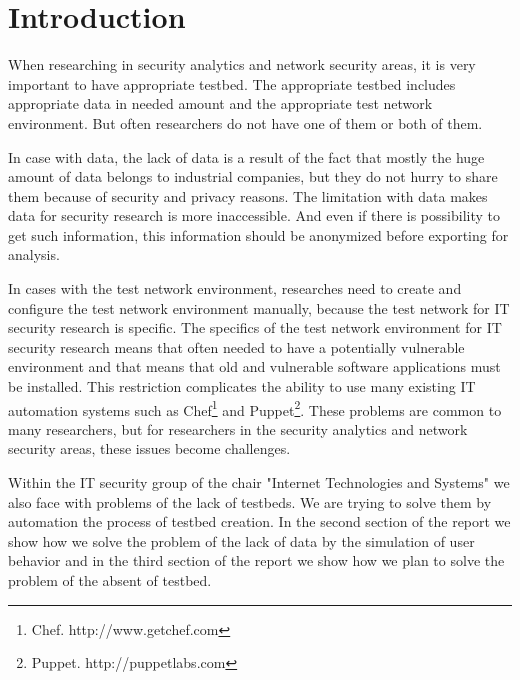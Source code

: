 \section{Introduction}


When researching in security analytics and network security areas, it is very important to have appropriate testbed. The appropriate testbed includes appropriate data in needed amount and the appropriate test network environment. But often researchers do not have one of them or both of them.  

In case with data, the lack of data is a result of the fact that mostly the huge amount of data belongs to industrial companies, but they do not hurry to share them because of security and privacy reasons. The limitation with data makes data for security research is more inaccessible. And even if there is possibility to get such information, this information should be anonymized before exporting for analysis.

In cases with the test network environment, researches need to create and configure the test network environment manually, because the test network for IT security research is specific. The specifics of the test network environment for IT security research means that often needed to have a potentially vulnerable environment and that means that old and vulnerable software applications must be installed. This restriction complicates the ability to use many existing IT automation systems such as Chef\footnote{Chef. http://www.getchef.com} and Puppet\footnote{Puppet. http://puppetlabs.com}. These problems are common to many researchers, but for researchers in the security analytics and network security areas, these issues become challenges. 

Within the IT security group of the chair "Internet Technologies and Systems" we also face with problems of the lack of testbeds. We are trying to solve them by automation the process of testbed creation. In the second section of the report we show how we solve the problem of the lack of data by the simulation of user behavior and in the third section of the report we show how we plan to solve the problem of the absent of testbed.



